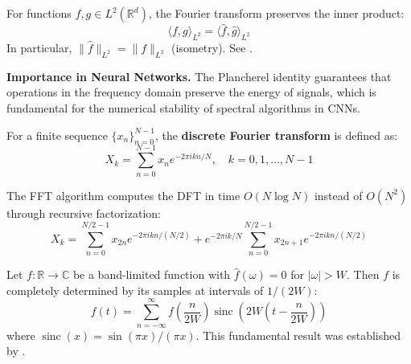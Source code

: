 \begin{theorem}\label{thm:plancherel}
For functions $f, g \in L^2(\mathbb{R}^d)$, the Fourier transform preserves the inner product:
\begin{equation}
\langle f, g \rangle_{L^2} = \langle \hat{f}, \hat{g} \rangle_{L^2}
\end{equation}
In particular, $\|\hat{f}\|_{L^2} = \|f\|_{L^2}$ (isometry). See \citep[Theorem~8.29]{Folland1999}.
\end{theorem}

\textbf{Importance in Neural Networks.} The Plancherel identity guarantees that operations in the frequency domain preserve the energy of signals, which is fundamental for the numerical stability of spectral algorithms in CNNs.

\begin{definition}\label{def:dft}
For a finite sequence $\{x_n\}_{n=0}^{N-1}$, the \textbf{discrete Fourier transform} is defined as:
\begin{equation}
X_k = \sum_{n=0}^{N-1} x_n e^{-2\pi i kn/N}, \quad k = 0, 1, \ldots, N-1
\end{equation}
\end{definition}

\begin{definition}\label{def:fft}
The \gls{FFT} algorithm computes the DFT in time $O(N \log N)$ instead of $O(N^2)$ through recursive factorization:
\begin{equation}
X_k = \sum_{n=0}^{N/2-1} x_{2n} e^{-2\pi i kn/(N/2)} + e^{-2\pi i k/N} \sum_{n=0}^{N/2-1} x_{2n+1} e^{-2\pi i kn/(N/2)}
\end{equation}
\end{definition}

\begin{theorem}\label{thm:nyquist_shannon}
Let $f: \mathbb{R} \to \mathbb{C}$ be a band-limited function with $\hat{f}(\omega) = 0$ for $|\omega| > W$. Then $f$ is completely determined by its samples at intervals of $1/(2W)$:
\begin{equation}
f(t) = \sum_{n=-\infty}^{\infty} f\left(\frac{n}{2W}\right) \operatorname{sinc}(2W(t - \frac{n}{2W}))
\end{equation}
where $\operatorname{sinc}(x) = \sin(\pi x)/(\pi x)$. This fundamental result was established by \citet{Shannon1948}.
\end{theorem}

